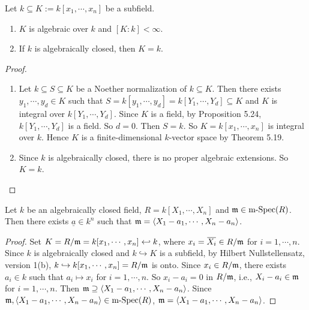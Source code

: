 \begin{theorem}
    Let $k \subseteq K := k[x_1,\cdots,x_n]$ be a subfield.
    \begin{enumerate}
        \item $K$ is algebraic over $k$ and $[K:k] < \infty$.
        \item If $k$ is algebraically closed, then $K = k$.
    \end{enumerate}
\end{theorem}

\begin{proof}
    \begin{enumerate}
        \item Let $k \subseteq S \subseteq K$ be a Noether normalization of $k \subseteq K$. Then there exists $y_1,\cdots,y_d \in K$ such that $S = k[y_1,\cdots,y_d] = k[Y_1,\cdots,Y_d] \subseteq K$ and $K$ is integral over $k[Y_1,\cdots,Y_d]$. Since $K$ is a field, by Proposition 5.24, $k[Y_1,\cdots,Y_d]$ is a field. So $d = 0$. Then $S = k$. So $K = k[x_1,\cdots,x_n]$ is integral over $k$. Hence $K$ is a finite-dimensional $k$-vector space by Theorem 5.19.
        \item Since $k$ is algebraically closed, there is no proper algebraic extensions. So $K = k$. \qedhere
    \end{enumerate}
\end{proof}

\begin{theorem}
    Let $k$ be an algebraically closed field, $R = k[X_1,\cdots,X_n]$ and $\mathfrak{m} \in \operatorname{m-Spec}(R)$. Then there exists $\underline a \in k^{n}$ such that $\mathfrak{m} = \langle X_1-a_1,\cdots,X_n-a_n \rangle$.
\end{theorem}

\begin{proof}
    Set $K = R/\mathfrak{m} = k[x_1,\cdots,x_n] \hookleftarrow k$, where $x_i = \overbar{X_i} \in R/\ffm$ for $i = 1,\cdots,n$. Since $k$ is algebraically closed and $k \hookrightarrow K$ is a subfield, by Hilbert Nullstellensatz, version 1(b), $k \hookrightarrow k[x_1,\cdots,x_n] = R/\mathfrak{m}$ is onto. Since $x_i \in R/\mathfrak{m}$, there exists $a_i \in k$ such that $a_i \mapsto x_i$ for $i = 1,\cdots,n$. So $x_i - a_i = 0$ in $R/\mathfrak{m}$, i.e., $X_i - a_i \in \mathfrak{m}$ for $i = 1,\cdots,n$. Then $\mathfrak{m} \supseteq \langle X_1-a_1,\cdots,X_n-a_n \rangle$. Since $\mathfrak{m},\langle X_1-a_1,\cdots,X_n-a_n \rangle \in \operatorname{m-Spec}(R)$, $\mathfrak{m} = \langle X_1-a_1,\cdots,X_n-a_n \rangle$.
\end{proof}

